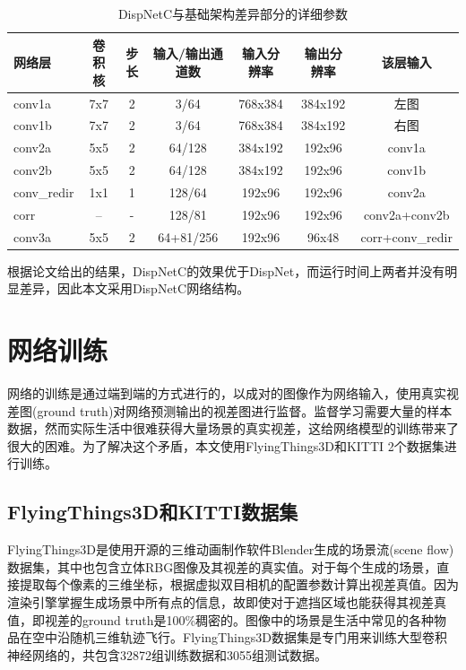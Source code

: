 \begin{table}[htbp]
	\centering
	\caption{DispNetC与基础架构差异部分的详细参数}
	\label{tab:4_1_DispNetC_architecture}
	\begin{small}
		\begin{tabular}{|l|c c c|c c|c|}\hline
			网络层  & 卷积核 & 步长 & 输入/输出通道数 & 输入分辨率 & 输出分辨率 & 该层输入 \\\hline
			conv1a             & 7x7 & 2 & 3/64                & 768x384 & 384x192 & 左图 \\
			conv1b             & 7x7 & 2 & 3/64                & 768x384 & 384x192 & 右图 \\
			conv2a             & 5x5 & 2 & 64/128           & 384x192  & 192x96    & conv1a \\
			conv2b             & 5x5 & 2 & 64/128           & 384x192  & 192x96    & conv1b \\
			conv\_redir      & 1x1 & 1 & 128/64            & 192x96    & 192x96    & conv2a \\
			corr                   & --   &  - & 128/81            & 192x96    & 192x96    & conv2a+conv2b \\
			conv3a            & 5x5 & 2 & 64+81/256    & 192x96    & 96x48      & corr+conv\_redir \\\hline
		\end{tabular}
	\end{small}
\end{table}

根据论文\cite{mayer2016large}给出的结果，DispNetC的效果优于DispNet，而运行时间上两者并没有明显差异，因此本文采用DispNetC网络结构。

\section{网络训练}
网络的训练是通过端到端的方式进行的，以成对的图像作为网络输入，使用真实视差图(ground truth)对网络预测输出的视差图进行监督。监督学习需要大量的样本数据，然而实际生活中很难获得大量场景的真实视差，这给网络模型的训练带来了很大的困难。为了解决这个矛盾，本文使用FlyingThings3D和KITTI 2个数据集进行训练。

\subsection{FlyingThings3D和KITTI数据集}
FlyingThings3D\cite{mayer2016large}是使用开源的三维动画制作软件Blender生成的场景流(scene flow)数据集，其中也包含立体RBG图像及其视差的真实值。对于每个生成的场景，直接提取每个像素的三维坐标，根据虚拟双目相机的配置参数计算出视差真值。因为渲染引擎掌握生成场景中所有点的信息，故即使对于遮挡区域也能获得其视差真值，即视差的ground truth是100\%稠密的。图像中的场景是生活中常见的各种物品在空中沿随机三维轨迹飞行。FlyingThings3D数据集是专门用来训练大型卷积神经网络的，共包含32872组训练数据和3055组测试数据。

